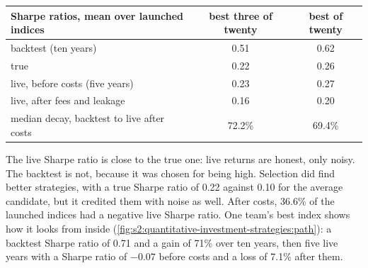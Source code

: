 \begin{center}
\small
\begin{tabular}{@{}lcc@{}}
\toprule
Sharpe ratios, mean over launched indices & best three of twenty & best of twenty\\
\midrule
backtest (ten years) & 0.51 & 0.62\\
true & 0.22 & 0.26\\
live, before costs (five years) & 0.23 & 0.27\\
live, after fees and leakage & 0.16 & 0.20\\
median decay, backtest to live after costs & 72.2\% & 69.4\%\\
\bottomrule
\end{tabular}
\end{center}

The live Sharpe ratio is close to the true one: live returns are honest, only noisy. The backtest is not, because it was chosen for being high. Selection
did find better strategies, with a true Sharpe ratio of 0.22 against 0.10 for the average candidate, but it credited them with noise as well. After
costs, 36.6\% of the launched indices had a negative live Sharpe ratio. One team's best index shows how it looks from inside
(\cref{fig:s2:quantitative-investment-strategies:path}): a backtest Sharpe ratio of 0.71 and a gain of 71\% over ten years, then five live years with a
Sharpe ratio of $-0.07$ before costs and a loss of 7.1\% after them.

\begin{omfigure}

\label{fig:s2:quantitative-investment-strategies:path}
\end{omfigure}

